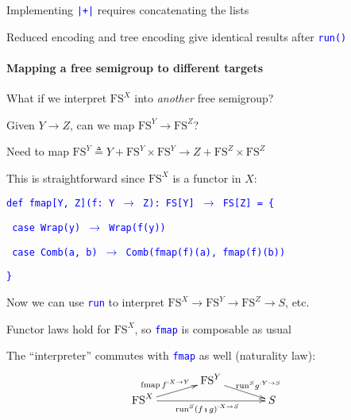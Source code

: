 Implementing \texttt{\textcolor{blue}{\footnotesize{}|+|}} requires
concatenating the lists 

Reduced encoding and tree encoding give identical results after \texttt{\textcolor{blue}{\footnotesize{}run()}} 


\paragraph{Mapping a free semigroup to different targets}

What if we interpret $\text{FS}^{X}$ into \emph{another} free semigroup?

Given $Y\rightarrow Z$, can we map $\text{FS}^{Y}\rightarrow\text{FS}^{Z}$?

Need to map $\text{FS}^{Y}\triangleq Y+\text{FS}^{Y}\times\text{FS}^{Y}\rightarrow Z+\text{FS}^{Z}\times\text{FS}^{Z}$

This is straightforward since $\text{FS}^{X}$ is a functor in $X$:

\texttt{\textcolor{blue}{\footnotesize{}def fmap{[}Y, Z{]}(f: Y $\rightarrow$
Z): FS{[}Y{]} $\rightarrow$ FS{[}Z{]} = \{}}{\footnotesize\par}

\texttt{\textcolor{blue}{\footnotesize{}  case Wrap(y) $\rightarrow$
Wrap(f(y))}}{\footnotesize\par}

\texttt{\textcolor{blue}{\footnotesize{}  case Comb(a, b) $\rightarrow$
Comb(fmap(f)(a), fmap(f)(b))}}{\footnotesize\par}

\texttt{\textcolor{blue}{\footnotesize{}\}}}{\footnotesize\par}

Now we can use \texttt{\textcolor{blue}{\footnotesize{}run}} to interpret
$\text{FS}^{X}\rightarrow\text{FS}^{Y}\rightarrow\text{FS}^{Z}\rightarrow S$,
etc.

Functor laws hold for $\text{FS}^{X}$, so \texttt{\textcolor{blue}{\footnotesize{}fmap}}
is composable as usual

The \textsf{``}interpreter\textsf{''} commutes with \texttt{\textcolor{blue}{\footnotesize{}fmap}}
as well (naturality law):{\footnotesize{}
\[
\xymatrix{\xyScaleY{0.2pc}\xyScaleX{3pc} & \text{FS}^{Y}\ar[rd]\sp(0.6){\ \text{run}^{S}g^{:Y\rightarrow S}}\\
\text{FS}^{X}\ar[ru]\sp(0.45){\text{fmap}\,f^{:X\rightarrow Y}}\ar[rr]\sb(0.5){\text{run}^{S}(f\bef g)^{:X\rightarrow S}} &  & S
}
\]
}{\footnotesize\par}

